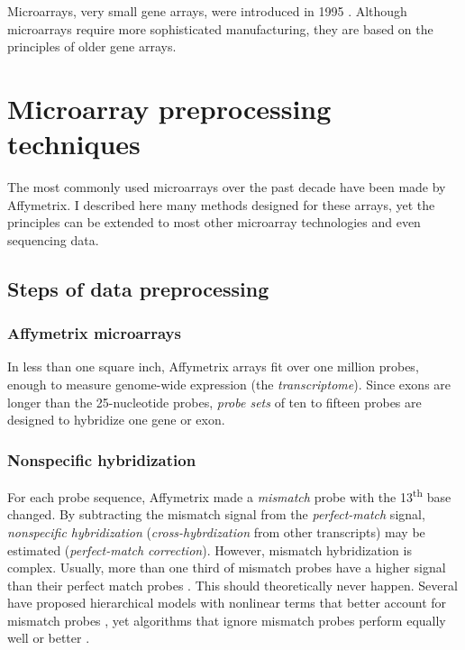 Microarrays, very small gene arrays, were introduced in 1995 \cite{Schena:1995fy}. 
Although microarrays require more sophisticated
manufacturing, they are based on the principles of older gene arrays.


\section[Microarray preprocessing]{Microarray preprocessing techniques}

The most commonly used microarrays over the past decade
have been made by Affymetrix. I described here many methods
designed for these arrays, yet the principles can be extended to
most other microarray technologies and even sequencing data.

\subsection{Steps of data preprocessing}\label{introjtm:steps}

\subsubsection{Affymetrix microarrays}

In less than one square inch, Affymetrix arrays fit over one million probes, enough
to measure genome-wide expression (the \textit{transcriptome}).
Since exons are longer than the 25-nucleotide probes,
\textit{probe sets} of ten to fifteen probes are designed to hybridize
one gene or exon.

\subsubsection{Nonspecific hybridization}

For each probe sequence, Affymetrix made a
\textit{mismatch} probe with the 13\textsuperscript{th} 
base changed. 
By subtracting the mismatch signal from the \textit{perfect-match} signal,
\textit{nonspecific hybridization} (\textit{cross-hybrdization} 
from other transcripts) may be 
estimated (\textit{perfect-match correction}).
However, mismatch hybridization is complex.
Usually, more than one third of mismatch probes have a higher
signal than their perfect match probes \cite{Irizarry:2003ge}. 
This should theoretically never happen. Several have proposed
hierarchical models with nonlinear terms that
better account for mismatch probes 
\cite{Li:2001jv,Milo:2003tt,Liu:2005ey,Hein:2005ip}, yet algorithms
that ignore mismatch probes perform equally
well or better \cite{Chen:2007cr,Irizarry:2003ge,Hochreiter:2006ja}.

